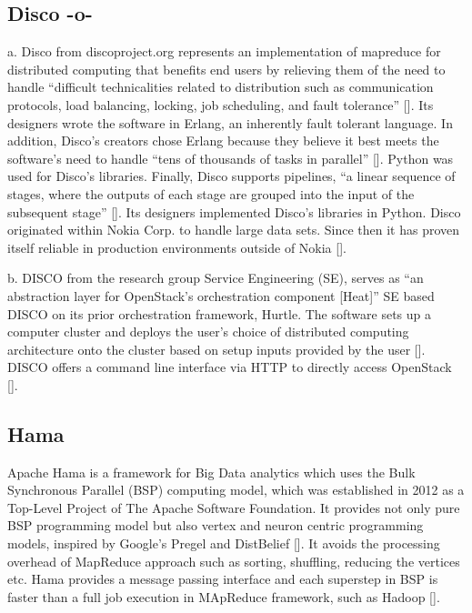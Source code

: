      
\subsection{Disco -o-}

a. Disco from discoproject.org represents an implementation of
mapreduce for distributed computing that benefits end users by
relieving them of the need to handle ``difficult technicalities
related to distribution such as communication protocols, load
balancing, locking, job scheduling, and fault
tolerance'' [\cite{www-whatis-discoproject}]. Its designers wrote the
software in Erlang, an inherently fault tolerant language. In
addition, Disco's creators chose Erlang because they believe it best
meets the software's need to handle ``tens of thousands of tasks in
parallel'' [\cite{www-erlangprime-discoproject}]. Python was used for
Disco's libraries. Finally, Disco supports pipelines, ``a linear
sequence of stages, where the outputs of each stage are grouped into
the input of the subsequent
stage'' [\cite{www-clarridge-discoproject}]. Its designers implemented
Disco's libraries in Python. Disco originated within Nokia Corp. to
handle large data sets.  Since then it has proven itself reliable in
production environments outside of
Nokia [\cite{www-nokia-discoproject}].

b. DISCO from the research group Service Engineering (SE), serves as
``an abstraction layer for OpenStack's orchestration component
[Heat]'' SE based DISCO on its prior orchestration framework,
Hurtle. The software sets up a computer cluster and deploys the user's
choice of distributed computing architecture onto the cluster based on
setup inputs provided by the
user [\cite{www-discoabout-discoabstractionlayer}].  DISCO offers a
command line interface via HTTP to directly access
OpenStack [\cite{www-discodescribed-discoabstractionlayer}].



\subsection{Hama}

Apache Hama is a framework for Big Data analytics which uses the Bulk
Synchronous Parallel (BSP) computing model, which was established in
2012 as a Top-Level Project of The Apache Software Foundation. It
provides not only pure BSP programming model but also vertex and
neuron centric programming models, inspired by Google's Pregel and
DistBelief [\cite{apache-hama}]. It avoids the processing overhead of
MapReduce approach such as sorting, shuffling, reducing the vertices
etc. Hama provides a message passing interface and each superstep in
BSP is faster than a full job execution in MApReduce framework, such
as Hadoop [\cite{book-hama}].
     
